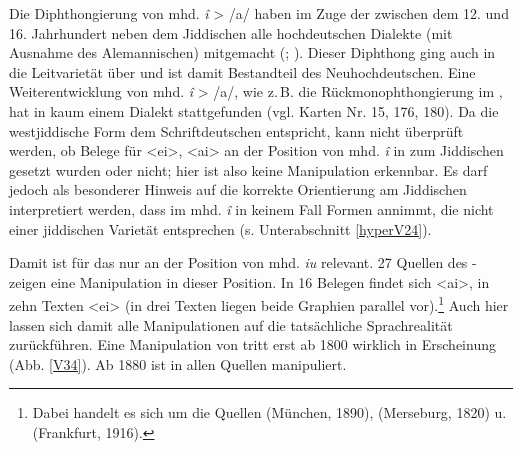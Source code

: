 Die Diphthongierung von mhd. \textit{î} > /a\textsubarch{\textsci}/ haben im Zuge der
 zwischen dem 12. und 16. Jahrhundert neben dem Jiddischen alle hochdeutschen Dialekte (mit Ausnahme des Alemannischen) mitgemacht (\cite[146–149]{Koenig1978}; \cite[14–18]{Timm1987}). Dieser Diphthong ging auch in die Leitvarietät über und ist damit Bestandteil des Neuhochdeutschen. Eine Weiterentwicklung von mhd. \textit{î} > /a\textsubarch{\textsci}/, wie z.\,B. die Rückmonophthongierung im , hat in kaum einem Dialekt stattgefunden (vgl.  Karten Nr. 15, 176, 180). Da die westjiddische Form dem Schriftdeutschen entspricht, kann nicht überprüft werden, ob Belege für <ei>, <ai> an der Position von mhd. \textit{î} in  zum Jiddischen gesetzt wurden oder nicht; hier ist also keine Manipulation erkennbar. Es darf jedoch als besonderer Hinweis auf die korrekte Orientierung am Jiddischen interpretiert werden, dass im  mhd. \textit{î} in keinem Fall Formen annimmt, die nicht einer jiddischen Varietät entsprechen (s. Unterabschnitt \ref{hyperV24}). 

Damit ist  für das  nur an der Position von mhd. \textit{iu} relevant. 27 Quellen des - zeigen eine Manipulation in dieser Position. In 16 Belegen findet sich <ai>, in zehn Texten <ei> (in drei Texten liegen beide Graphien parallel vor).\footnote{Dabei handelt es sich um die Quellen  (München, 1890),  (Merseburg, 1820) u.  (Frankfurt, 1916).} Auch hier lassen sich damit alle Manipulationen auf die tatsächliche Sprachrealität zurückführen. Eine Manipulation von  tritt erst ab 1800 wirklich in Erscheinung (Abb. \ref{V34}).  Ab 1880 ist  in allen Quellen manipuliert. \\
 
